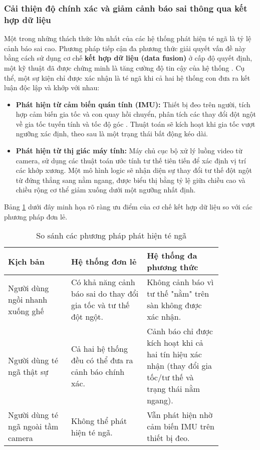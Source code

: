\subsubsection{Cải thiện độ chính xác và giảm cảnh báo sai thông qua kết hợp dữ liệu}
Một trong những thách thức lớn nhất của các hệ thống phát hiện té ngã là tỷ lệ cảnh báo sai cao. Phương pháp tiếp cận đa phương thức giải quyết vấn đề này bằng cách sử dụng cơ chế \textbf{kết hợp dữ liệu (data fusion)} ở cấp độ quyết định, một kỹ thuật đã được chứng minh là tăng cường độ tin cậy của hệ thống \cite{mdpi_data_fusion}. Cụ thể, một sự kiện chỉ được xác nhận là té ngã khi cả hai hệ thống con đưa ra kết luận độc lập và khớp với nhau:

\begin{itemize}
    \item \textbf{Phát hiện từ cảm biến quán tính (IMU):} Thiết bị đeo trên người, tích hợp cảm biến gia tốc và con quay hồi chuyển, phân tích các thay đổi đột ngột về gia tốc tuyến tính và tốc độ góc \cite{resna_imu}. Thuật toán sẽ kích hoạt khi gia tốc vượt ngưỡng xác định, theo sau là một trạng thái bất động kéo dài.
    \item \textbf{Phát hiện từ thị giác máy tính:} Máy chủ cục bộ xử lý luồng video từ camera, sử dụng các thuật toán ước tính tư thế tiên tiến để xác định vị trí các khớp xương. Một mô hình logic sẽ nhận diện sự thay đổi tư thế đột ngột từ đứng thẳng sang nằm ngang, được biểu thị bằng tỷ lệ giữa chiều cao và chiều rộng cơ thể giảm xuống dưới một ngưỡng nhất định.
\end{itemize}

Bảng \ref{tab:so_sanh_phuong_phap} dưới đây minh họa rõ ràng ưu điểm của cơ chế kết hợp dữ liệu so với các phương pháp đơn lẻ.

\begin{table}[h!]
    \centering
    \caption{So sánh các phương pháp phát hiện té ngã}
    \label{tab:so_sanh_phuong_phap}
    \begin{tabular}{|p{0.25\linewidth}|p{0.3\linewidth}|p{0.3\linewidth}|}
        \hline
        \textbf{Kịch bản} & \textbf{Hệ thống đơn lẻ} & \textbf{Hệ thống đa phương thức} \\
        \hline
        Người dùng ngồi nhanh xuống ghế & Có khả năng cảnh báo sai do thay đổi gia tốc và tư thế đột ngột. & Không cảnh báo vì tư thế "nằm" trên sàn không được xác nhận. \\
        \hline
        Người dùng té ngã thật sự & Cả hai hệ thống đều có thể đưa ra cảnh báo chính xác. & Cảnh báo chỉ được kích hoạt khi cả hai tín hiệu xác nhận (thay đổi gia tốc/tư thế và trạng thái nằm ngang). \\
        \hline
        Người dùng té ngã ngoài tầm camera & Không thể phát hiện té ngã. & Vẫn phát hiện nhờ cảm biến IMU trên thiết bị đeo. \\
        \hline
    \end{tabular}
\end{table}

